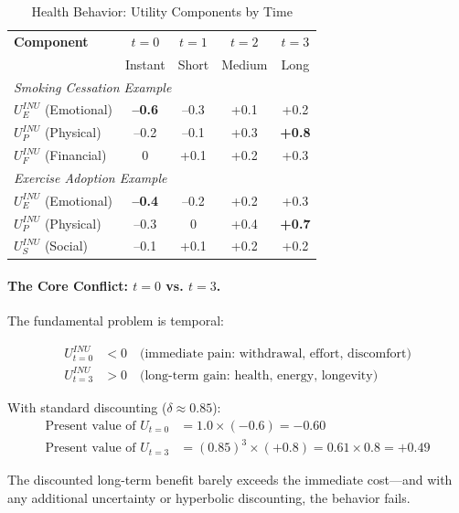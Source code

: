 \begin{table}[htbp]
\centering
\caption{Health Behavior: Utility Components by Time}
\label{tab:health-components}
\renewcommand{\arraystretch}{1.2}
\begin{tabular}{@{}lcccc@{}}
\toprule
\textbf{Component} & $t=0$ & $t=1$ & $t=2$ & $t=3$ \\
& Instant & Short & Medium & Long \\
\midrule
\multicolumn{5}{l}{\textit{Smoking Cessation Example}} \\
$U^{INU}_E$ (Emotional) & \textbf{--0.6} & --0.3 & +0.1 & +0.2 \\
$U^{INU}_P$ (Physical) & --0.2 & --0.1 & +0.3 & \textbf{+0.8} \\
$U^{INU}_F$ (Financial) & 0 & +0.1 & +0.2 & +0.3 \\
\midrule
\multicolumn{5}{l}{\textit{Exercise Adoption Example}} \\
$U^{INU}_E$ (Emotional) & \textbf{--0.4} & --0.2 & +0.2 & +0.3 \\
$U^{INU}_P$ (Physical) & --0.3 & 0 & +0.4 & \textbf{+0.7} \\
$U^{INU}_S$ (Social) & --0.1 & +0.1 & +0.2 & +0.2 \\
\bottomrule
\end{tabular}
\end{table}

\paragraph{The Core Conflict: $t=0$ vs. $t=3$.}
The fundamental problem is temporal:

\begin{align}
U^{INU}_{t=0} &< 0 \quad \text{(immediate pain: withdrawal, effort, discomfort)} \\
U^{INU}_{t=3} &> 0 \quad \text{(long-term gain: health, energy, longevity)}
\end{align}

With standard discounting ($\delta \approx 0.85$):
\begin{align}
\text{Present value of } U_{t=0} &= 1.0 \times (-0.6) = -0.60 \\
\text{Present value of } U_{t=3} &= (0.85)^3 \times (+0.8) = 0.61 \times 0.8 = +0.49
\end{align}

The discounted long-term benefit barely exceeds the immediate cost---and 
with any additional uncertainty or hyperbolic discounting, the behavior fails.

